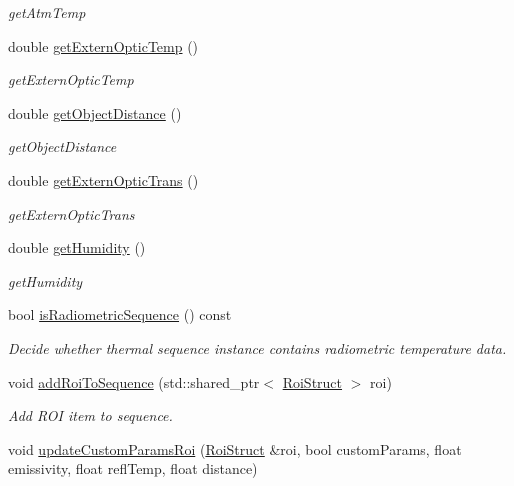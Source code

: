 \begin{DoxyCompactItemize}
\begin{DoxyCompactList}\small\item\em get\+Atm\+Temp \end{DoxyCompactList}\item 
double \hyperlink{classwtl_1_1_sequence_radiometric_a98d3f1c3318a7e5ffb9812b693bb49d0}{get\+Extern\+Optic\+Temp} ()
\begin{DoxyCompactList}\small\item\em get\+Extern\+Optic\+Temp \end{DoxyCompactList}\item 
double \hyperlink{classwtl_1_1_sequence_radiometric_a65570c0765b96e161b260d1582379e0a}{get\+Object\+Distance} ()
\begin{DoxyCompactList}\small\item\em get\+Object\+Distance \end{DoxyCompactList}\item 
double \hyperlink{classwtl_1_1_sequence_radiometric_ad07e40b2ad7f0dcb1b0db5de47bfebb0}{get\+Extern\+Optic\+Trans} ()
\begin{DoxyCompactList}\small\item\em get\+Extern\+Optic\+Trans \end{DoxyCompactList}\item 
double \hyperlink{classwtl_1_1_sequence_radiometric_a5c45c9e5200e04e67fa65cb56f1f17dc}{get\+Humidity} ()
\begin{DoxyCompactList}\small\item\em get\+Humidity \end{DoxyCompactList}\item 
bool \hyperlink{classwtl_1_1_sequence_radiometric_aa0b063cfe218f95cd57412344d4f9a04}{is\+Radiometric\+Sequence} () const
\begin{DoxyCompactList}\small\item\em Decide whether thermal sequence instance contains radiometric temperature data. \end{DoxyCompactList}\item 
void \hyperlink{classwtl_1_1_sequence_radiometric_a3cca0f0bbabe787926910bcedd9307ea}{add\+Roi\+To\+Sequence} (std\+::shared\+\_\+ptr$<$ \hyperlink{structwtl_1_1_roi_struct}{Roi\+Struct} $>$ roi)
\begin{DoxyCompactList}\small\item\em Add R\+OI item to sequence. \end{DoxyCompactList}\item 
void \hyperlink{classwtl_1_1_sequence_radiometric_ab42fcdd2531eb26af5f4801e1c8f171b}{update\+Custom\+Params\+Roi} (\hyperlink{structwtl_1_1_roi_struct}{Roi\+Struct} \&roi, bool custom\+Params, float emissivity, float refl\+Temp, float distance)

\end{DoxyCompactItemize}
